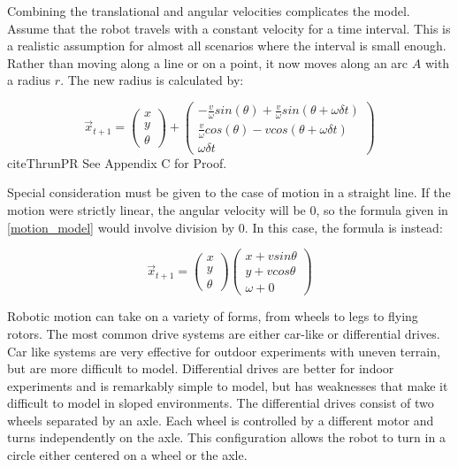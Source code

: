 \documentclass[12pt]{report}
\begin{document}
Combining the translational and angular velocities complicates the model.  Assume that the robot travels with a constant velocity for a time interval.  This is a realistic assumption for almost all scenarios where the interval is small enough.  Rather than moving along a line or on a point, it now moves along an arc $A$ with a radius $r$.  The new  radius is calculated by: 

\begin{equation}
\label{motion_model}
\vec{x}_{t+1}=
\begin{pmatrix}
 x \\
 y \\
\theta
\end{pmatrix}  +
\begin{pmatrix}
 -\frac{v}{\omega} sin(\theta)+\frac{v}{\omega} sin(\theta + \omega \delta t) \\
 \frac{v}{\omega} cos(\theta)-v cos(\theta + \omega \delta t)  \\
\omega \delta t
\end{pmatrix}
\end{equation}
cite{ThrunPR}
{See Appendix C for Proof}.  

Special consideration must be given to the case of motion in a straight line.  If the motion were strictly linear, the angular velocity will be 0, so the formula given in \ref{motion_model} would involve division by 0.  In this case, the formula is instead:

\begin{equation}
\label{motion_linear}
\vec{x}_{t+1} =
\begin{pmatrix}
 x \\
 y \\
\theta
\end{pmatrix}
\begin{pmatrix}
 x + v sin \theta \\
 y + v cos \theta  \\
\omega + 0
\end{pmatrix}
\end{equation}

Robotic motion can take on a variety of forms, from wheels to legs to flying rotors.  The most common drive systems are either car-like or differential drives.  Car like systems are very effective for outdoor experiments with uneven terrain, but are more difficult to model.  Differential drives are better for indoor experiments and is remarkably simple to model, but has weaknesses that make it difficult to model in sloped environments.  The differential drives consist of two wheels separated by an axle.  Each wheel is controlled by a different motor and turns independently on the axle.  This configuration allows the robot to turn in a circle either centered on a wheel or the axle.  
\end{document}

